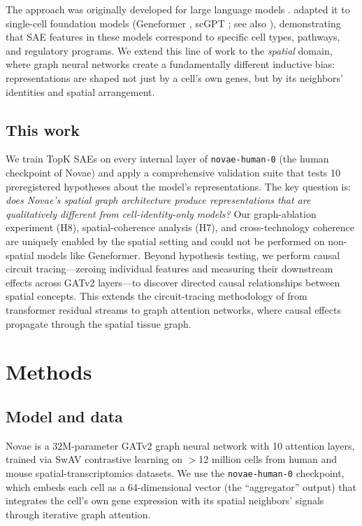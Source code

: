 \documentclass[11pt]{article}
\begin{document}
The approach was originally developed for large language models
\citep{sharkey2022,bricken2023,conmy2023,bills2023,templeton2024,marks2025,gao2024}.
\citet{sae_atlas} adapted it to single-cell foundation models
(Geneformer \citep{geneformer}, scGPT \citep{scgpt}; see also
\citealt{yang2022,hao2024,rosen2023}), demonstrating that SAE features in these models
correspond to specific cell types, pathways, and regulatory programs.
We extend this line of work to the \emph{spatial} domain, where graph
neural networks create a fundamentally different inductive bias:
representations are shaped not just by a cell's own genes, but by its
neighbors' identities and spatial arrangement.

\subsection{This work}

We train TopK SAEs \citep{gao2024} on every internal layer of
\texttt{novae-human-0} (the human checkpoint of Novae) and apply a
comprehensive validation suite that tests 10 preregistered hypotheses
about the model's representations. The key question is: \emph{does
Novae's spatial graph architecture produce representations that are
qualitatively different from cell-identity-only models?} Our graph-ablation
experiment (H8), spatial-coherence analysis (H7), and cross-technology
coherence are uniquely enabled by the spatial setting and
could not be performed on non-spatial models like Geneformer.
Beyond hypothesis testing, we perform causal circuit tracing---zeroing
individual features and measuring their downstream effects across GATv2
layers---to discover directed causal relationships between spatial
concepts. This extends the circuit-tracing methodology of
\citet{sae_atlas} from transformer residual streams to graph attention
networks, where causal effects propagate through the spatial tissue
graph.

\section{Methods}

\subsection{Model and data}

Novae \citep{novae} is a 32M-parameter GATv2 graph neural network
with 10 attention layers, trained via SwAV contrastive learning on
$>$12 million cells from human and mouse spatial-transcriptomics
datasets. We use the \texttt{novae-human-0} checkpoint, which
embeds each cell as a 64-dimensional vector (the ``aggregator''
output) that integrates the cell's own gene expression with its
spatial neighbors' signals through iterative graph attention.
\end{document}
